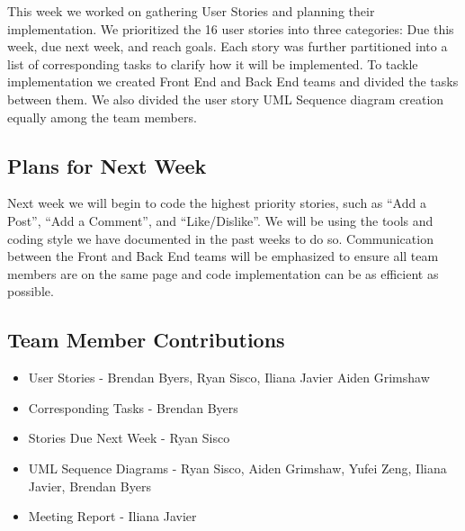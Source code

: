 \documentclass[12pt]{article}
\begin{document}
This week we worked on gathering User Stories and planning their implementation.
We prioritized the 16 user stories into three categories: Due this week, due
next week, and reach goals. Each story was further partitioned into a list of
corresponding tasks to clarify how it will be implemented. To tackle
implementation we created Front End and Back End teams and divided the tasks
between them. We also divided the user story UML Sequence diagram creation
equally among the team members.

\subsection{Plans for Next Week}

Next week we will begin to code the highest priority stories, such as “Add a
Post”, “Add a Comment”, and “Like/Dislike”. We will be using the tools and
coding style we have documented in the past weeks to do so. Communication
between the Front and Back End teams will be emphasized to ensure all team
members are on the same page and code implementation can be as efficient as
possible.

\subsection{Team Member Contributions}

\begin{itemize}
  \item User Stories - Brendan Byers, Ryan Sisco, Iliana Javier Aiden Grimshaw
  \item Corresponding Tasks - Brendan Byers
  \item Stories Due Next Week - Ryan Sisco
  \item UML Sequence Diagrams - Ryan Sisco, Aiden Grimshaw, Yufei Zeng, Iliana Javier, Brendan Byers
  \item Meeting Report -  Iliana Javier
\end{itemize}
\end{document}
